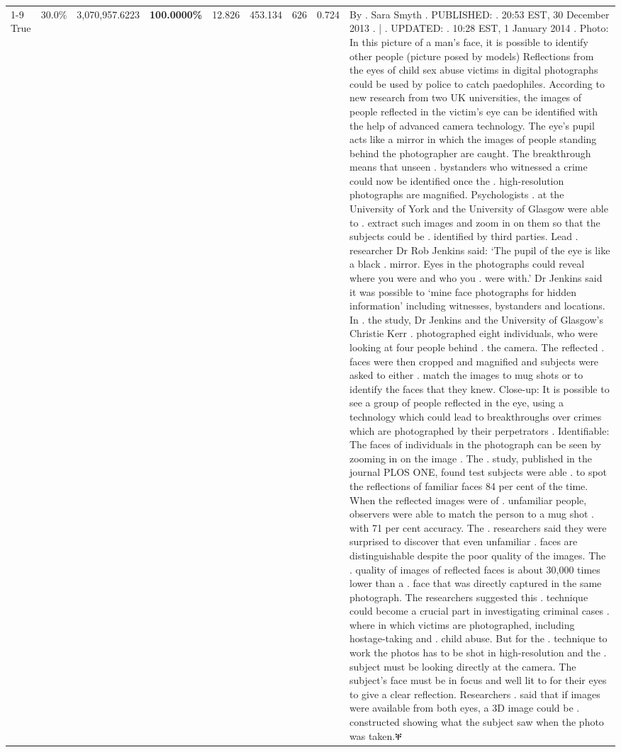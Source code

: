 \begin{table}[H]
\begin{tabular}{lllrlllll}
\cline{1-9}
True & 30.0\% & 3,070,957.6223 & \bfseries \color{red} 100.0000\% & 12.826 & 453.134 & 626 & 0.724 & By . Sara Smyth . PUBLISHED: . 20:53 EST, 30 December 2013 . | . UPDATED: . 10:28 EST, 1 January 2014 . Photo: In this picture of a man's face, it is possible to identify other people (picture posed by models) Reflections from the eyes of child sex abuse victims in digital photographs could be used by police to catch paedophiles. According to new research from two UK universities, the images of people reflected in the victim's eye can be identified with the help of advanced camera technology. The eye's pupil acts like a mirror in which the images of people standing behind the photographer are caught. The breakthrough means that unseen . bystanders who witnessed a crime could now be identified once the . high-resolution photographs are magnified. Psychologists . at the University of York and the University of Glasgow were able to . extract such images and zoom in on them so that the subjects could be . identified by third parties. Lead . researcher Dr Rob Jenkins said: ‘The pupil of the eye is like a black . mirror. Eyes in the photographs could reveal where you were and who you . were with.' Dr Jenkins said it was possible to ‘mine face photographs for hidden information' including witnesses, bystanders and locations. In . the study, Dr Jenkins and the University of Glasgow's Christie Kerr . photographed eight individuals, who were looking at four people behind . the camera. The reflected . faces were then cropped and magnified and subjects were asked to either . match the images to mug shots or to identify the faces that they knew. Close-up: It is possible to see a group of people reflected in the eye, using a technology which could lead to breakthroughs over crimes which are photographed by their perpetrators . Identifiable: The faces of individuals in the photograph can be seen by zooming in on the image . The . study, published in the journal PLOS ONE, found test subjects were able . to spot the reflections of familiar faces 84 per cent of the time. When the reflected images were of . unfamiliar people, observers were able to match the person to a mug shot . with 71 per cent accuracy. The . researchers said they were surprised to discover that even unfamiliar . faces are distinguishable despite the poor quality of the images. The . quality of images of reflected faces is about 30,000 times lower than a . face that was directly captured in the same photograph. The researchers suggested this . technique could become a crucial part in investigating criminal cases . where in which victims are photographed, including hostage-taking and . child abuse. But for the . technique to work the photos has to be shot in high-resolution and the . subject must be looking directly at the camera. The subject's face must be in focus and well lit to for their eyes to give a clear reflection. Researchers . said that if images were available from both eyes, a 3D image could be . constructed showing what the subject saw when the photo was taken.ቐ \\

\end{tabular}
\end{table}
